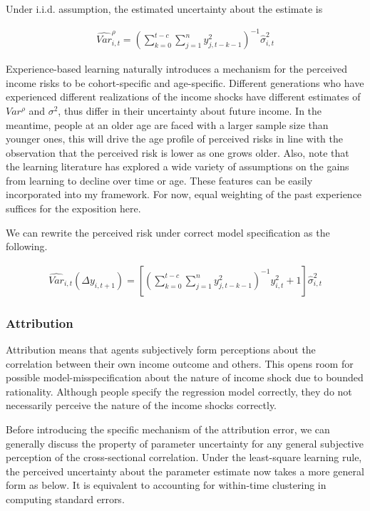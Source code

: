 \documentclass[12pt,notitlepage,onecolumn,aps,pra]{article}
\begin{document}
Under i.i.d. assumption, the estimated uncertainty about the estimate is

\begin{eqnarray}
\widehat {Var}^{\rho}_{i,t} = (\sum^{t-c}_{k=0}\sum^{n}_{j=1}y^2_{j,t-k-1})^{-1}\widehat{\sigma}^2_{i,t}
\end{eqnarray}

Experience-based learning naturally introduces a mechanism for the
perceived income risks to be cohort-specific and age-specific. Different
generations who have experienced different realizations of the income
shocks have different estimates of \(Var^{\rho}\) and \(\sigma^2\), thus
differ in their uncertainty about future income. In the meantime, people
at an older age are faced with a larger sample size than younger ones,
this will drive the age profile of perceived risks in line with the
observation that the perceived risk is lower as one grows older. Also,
note that the learning literature has explored a wide variety of
assumptions on the gains from learning to decline over time or age.
These features can be easily incorporated into my framework. For now,
equal weighting of the past experience suffices for the exposition here.

We can rewrite the perceived risk under correct model specification as
the following.

\begin{eqnarray}
\widehat{Var}_{i,t}(\Delta y_{i,t+1}) = [(\sum^{t-c}_{k=0}\sum^{n}_{j=1}y^2_{j,t-k-1})^{-1}y^2_{i,t} + 1] \hat{\sigma}^2_{i,t}
\end{eqnarray}

    \hypertarget{attribution}{%
\subsubsection{Attribution}\label{attribution}}

Attribution means that agents subjectively form perceptions about the
correlation between their own income outcome and others. This opens room
for possible model-misspecification about the nature of income shock due
to bounded rationality. Although people specify the regression model
correctly, they do not necessarily perceive the nature of the income
shocks correctly.

Before introducing the specific mechanism of the attribution error, we
can generally discuss the property of parameter uncertainty for any
general subjective perception of the cross-sectional correlation. Under
the least-square learning rule, the perceived uncertainty about the
parameter estimate now takes a more general form as below. It is
equivalent to accounting for within-time clustering in computing
standard errors.
\end{document}
